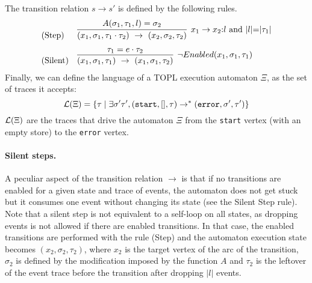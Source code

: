 \documentclass[10pt, preprint]{sigplanconf} %
\begin{document}
The transition relation $s \to s'$ is defined by the following rules.
\[
\begin{array}{ll}
\text{(Step)}  &
\infer[x_1 \to x_2{:} l \mbox{ and } |l|{=}|\tau_1| ]{ (x_1,\sigma_1,\tau_1 \cdot \tau_2 ) \  \to \  (x_2, \sigma_2, \tau_2)}{A(\sigma_1,\tau_1,l)=\sigma_2}
\\[2ex]
\text{(Silent)}  &
\infer[\neg Enabled(x_1,\sigma_1,\tau_1) ]{ (x_1,\sigma_1,\tau_1) \  \to \  (x_1, \sigma_1, \tau_2)}{ \tau_1=e \cdot \tau_2}
\end{array}
\]
Finally, we can define the language of a TOPL execution automaton $\Xi$, as the set of traces it accepts:
\[
{\cal L}(\Xi) = \{ \tau \mid \exists \sigma' \tau', (\mathtt{start},[],\tau) \to^* (\mathtt{error},\sigma',\tau')\}
\]
${\cal L}(\Xi)$ are the traces that drive the automaton $\Xi$ from the \texttt{start} vertex (with an empty store) to the \texttt{error} vertex.

\paragraph{Silent steps.}
A peculiar aspect of the transition relation $\to$ is that if no transitions are enabled for a given state and trace of events, the automaton does not get stuck but it consumes one event without changing its state (see the  Silent Step rule).
Note that a silent step is not equivalent to a self-loop on all states, as dropping events is not allowed if there are enabled transitions.
In that case,  the enabled transitions are performed with the rule (Step) and the automaton execution state becomes $(x_2, \sigma_2,\tau_2)$, where $x_2$ is the target vertex of the arc of the transition, $\sigma_2$ is defined by the modification imposed by the function $A$ and $\tau_2$ is the leftover of the event trace before the transition after dropping $|l|$ events.
\end{document}

